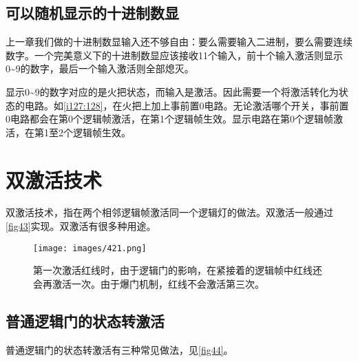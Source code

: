 \subsection{可以随机显示的十进制数显}

上一章我们做的十进制数显输入还不够自由：要么需要输入二进制，要么需要连续数字。一个完美意义下的十进制数显应该接收11个输入，前十个输入激活则显示0\~{}9的数字，最后一个输入激活则全部熄灭。

显示0\~{}9的数字对应的是火把状态，而输入是激活。因此需要一个将激活转化为状态的电路。如\autoref{i127:128}，在火把上加上事前置0电路。无论激活哪个开关，事前置0电路都会在第0个逻辑帧激活，在第1个逻辑帧生效。显示电路在第0个逻辑帧激活，在第1至2个逻辑帧生效。

\begin{figure}[!ht]
\begin{center}
\qquad
{}
\end{center}
\caption{}
\label{i127:128}
\end{figure}

\section{双激活技术}\label{sec33}
双激活技术，指在两个相邻逻辑帧激活同一个逻辑灯的做法。双激活一般通过\autoref{fig43}实现。双激活有很多种用途。
\begin{figure}[!ht]
\centering
\texttt{[image: images/421.png]}
\caption{第一次激活红线时，由于逻辑门的影响，在紧接着的逻辑帧中红线还会再激活一次。由于爆门机制，红线不会激活第三次。}\label{fig43}
\end{figure}

\subsection{普通逻辑门的状态转激活}
普通逻辑门的状态转激活有三种常见做法，见\autoref{fig44}。

\begin{figure}[!ht]
\centering
{}
\qquad
{}
\qquad
{}
\caption{}\label{fig44}
\end{figure}

